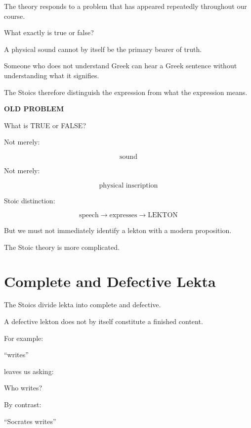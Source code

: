 \documentclass[11pt]{article}
\begin{document}
The theory responds to a problem that has appeared repeatedly
throughout our course.

What exactly is true or false?

A physical sound cannot by itself be the primary bearer of truth.

Someone who does not understand Greek can hear a Greek
sentence without understanding what it signifies.

The Stoics therefore distinguish the expression from what the
expression means.

\begin{whiteboard}
\textbf{OLD PROBLEM}

What is TRUE or FALSE?

Not merely:

\[
\text{sound}
\]

Not merely:

\[
\text{physical inscription}
\]

Stoic distinction:

\[
\boxed{
\text{speech}
\rightarrow
\text{expresses}
\rightarrow
\text{LEKTON}
}
\]
\end{whiteboard}

But we must not immediately identify a lekton with a modern
proposition.

The Stoic theory is more complicated.

\section{Complete and Defective Lekta}

The Stoics divide lekta into complete and defective.

A defective lekton does not by itself constitute a finished
content.

For example:

\begin{center}
``writes''
\end{center}

leaves us asking:

\begin{center}
Who writes?
\end{center}

By contrast:

\begin{center}
``Socrates writes''
\end{center}
\end{document}
